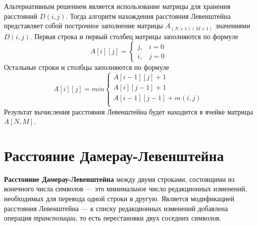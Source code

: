 Альтернативным решением является использование матрицы для хранения расстояний $D(i, j)$.
Тогда алгоритм нахождения расстояния Левенштейна представляет собой построчное заполнение матрицы $A_{(N + 1)(M + 1)}$ значениями $D(i, j)$.
Первая строка и первый столбец матрицы заполняются по формуле
\begin{equation}
	\label{eq:fir}
	A[i][j] = \begin{cases}
		j, & i = 0\\
		i, & j = 0
	\end{cases}
\end{equation}
Остальные строки и столбцы заполняются по формуле
\begin{equation}
	\label{eq:oth}
	A[i][j] = min \begin{cases}
		A[i-1][j] + 1\\
		A[i][j-1] + 1\\
		A[i-1][j-1] + m(i, j)\\
	\end{cases}
\end{equation}
Результат вычисления расстояния Левенштейна будет находится в ячейке матрицы $A[N, M]$.
	
\section{Расстояние Дамерау-Левенштейна}

\textbf{Расстояние Дамерау-Левенштейна} \cite{damerau-levenshtein} между двумя строками, состоящими из конечного числа символов — это минимальное число редакционных изменений, необходимых для перевода одной строки в другую.
Является модификацией расстояния Левенштейна --- к списку редакционных изменений добавлена операция \textit{транспозиции}, то есть перестановки двух соседних символов.

